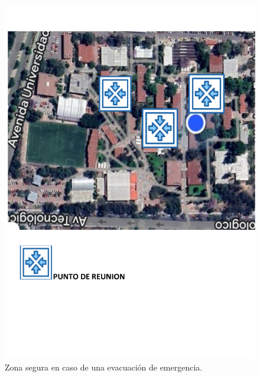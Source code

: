     \begin{figure}[H]
        \centering
        \includegraphics[trim = {40mm 60mm 20mm 21mm},clip,scale=0.35]{9/Img/puntoReunion.pdf}
        \caption{Zona segura en caso de una evacuación de emergencia.}
        \label{fig:puntosDeReunión}
    \end{figure}

